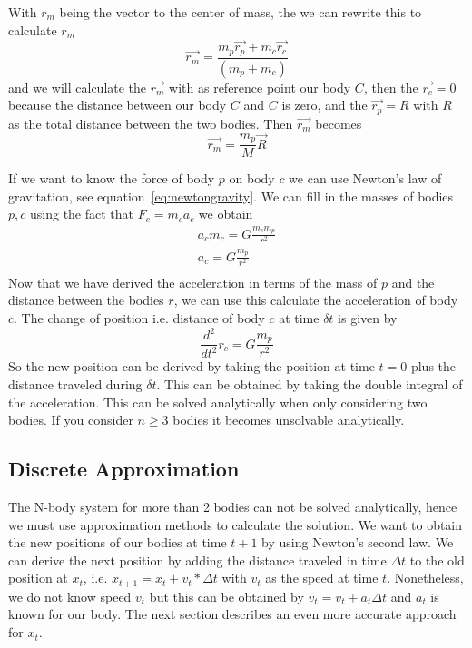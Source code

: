 \documentclass[11pt]{article} %
\begin{document}
With $r_m$ being the vector to the center of mass, the we can rewrite this to calculate $r_m$
\begin{equation}
	\overrightarrow{r_m} = \frac{m_p\overrightarrow{r_p} + m_c\overrightarrow{r_c}}{(m_p + m_c)}
\end{equation}
and we will calculate the $\overrightarrow{r_m}$ with as reference point our body $C$, then the $\overrightarrow{r_c}=0$ because the distance between our body $C$ and $C$ is zero, and the $\overrightarrow{r_p}=R$ with $R$ as the total distance between the two bodies. Then $\overrightarrow{r_m}$ becomes
\begin{equation}
	\overrightarrow{r_m} = \frac{m_p}{M}\overrightarrow{R}
\end{equation}


If we want to know the force of body $p$ on body $c$ we can use Newton's law of gravitation, see equation~\ref{eq:newtongravity}.  We can fill in the masses of bodies $p,c$ using the fact that $F_c = m_c a_c$ we obtain
\begin{equation}
    \begin{split}
     a_c m_c = G\frac{m_c m_p}{r^2} \\
     a_c = G\frac{m_p}{r^2} \\
    \end{split}
\end{equation}
Now that we have derived the acceleration in terms of the mass of $p$ and the distance between the bodies $r$, we can use this calculate the acceleration of body $c$. The change of position i.e. distance of body $c$ at time $\delta t$ is given by
\begin{equation}
    \frac{d^2}{dt^2} r_c = G \frac{m_p}{r^2}
\end{equation}
So the new position can be derived by taking the position at time $t=0$ plus the distance traveled during $\delta t$. This can be obtained by taking the double integral of the acceleration. This can be solved analytically when only considering two bodies. If you consider $n \geq 3$ bodies it becomes unsolvable analytically. 
\subsection{Discrete Approximation}
The N-body system for more than 2 bodies can not be solved analytically, hence we must use approximation methods to calculate the solution.
We want to obtain the new positions of our bodies at time $t+1$ by using Newton's second law. We can derive the next position by adding the distance traveled in time $\Delta t$ to the old position at $x_t$, i.e. $x_{t+1} = x_t + v_t*\Delta t$ with $v_t$ as the speed at time $t$. Nonetheless, we do not know speed $v_t$ but this can be obtained by $v_t = v_t + a_t \Delta t$ and $a_t$ is known for our body. The next section describes an even more accurate approach for $x_t$.
\end{document}
